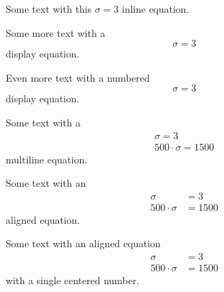 Some text with this $\sigma = 3$ inline equation.

Some more text with a
$$ \sigma = 3 $$
display equation.

Even more text with a numbered
\begin{equation}
    \sigma = 3
\end{equation}
display equation.

Some text with a
\begin{align}
    \sigma = 3\\
    500 \cdot \sigma =  1500
\end{align}
multiline equation.

Some text with an
\begin{align}
    \sigma & = 3\\
    500 \cdot \sigma & =  1500
\end{align}
aligned equation.

Some text with an aligned equation
\begin{equation}
\begin{aligned}
    \sigma & = 3\\
    500 \cdot \sigma & =  1500
\end{aligned}
\end{equation}
with a single centered number.
